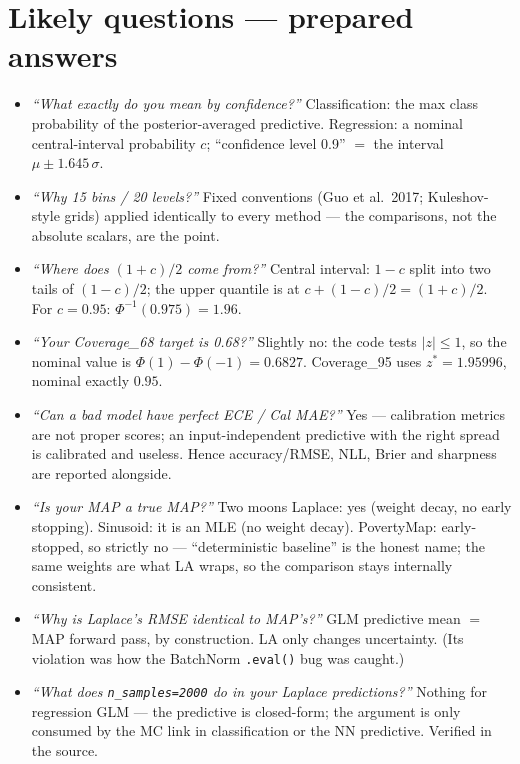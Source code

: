 \documentclass[10pt,a4paper]{article}
\newcommand{\code}[1]{\texttt{#1}}
\begin{document}
\section{Likely questions --- prepared answers}\label{sec:qa}
\begin{itemize}
\item \emph{``What exactly do you mean by confidence?''} Classification: the max class probability
  of the posterior-averaged predictive. Regression: a nominal central-interval probability $c$;
  ``confidence level 0.9'' $=$ the interval $\mu\pm1.645\,\sigma$.
\item \emph{``Why 15 bins / 20 levels?''} Fixed conventions (Guo et al.\ 2017; Kuleshov-style
  grids) applied identically to every method --- the comparisons, not the absolute scalars, are
  the point.
\item \emph{``Where does $(1+c)/2$ come from?''} Central interval: $1-c$ split into two tails of
  $(1-c)/2$; the upper quantile is at $c+(1-c)/2=(1+c)/2$. For $c{=}0.95$: $\Phi^{-1}(0.975)=1.96$.
\item \emph{``Your Coverage\_68 target is 0.68?''} Slightly no: the code tests $|z|\le1$, so the
  nominal value is $\Phi(1)-\Phi(-1)=0.6827$. Coverage\_95 uses $z^*{=}1.95996$, nominal exactly
  $0.95$.
\item \emph{``Can a bad model have perfect ECE / Cal MAE?''} Yes --- calibration metrics are not
  proper scores; an input-independent predictive with the right spread is calibrated and useless.
  Hence accuracy/RMSE, NLL, Brier and sharpness are reported alongside.
\item \emph{``Is your MAP a true MAP?''} Two moons Laplace: yes (weight decay, no early stopping).
  Sinusoid: it is an MLE (no weight decay). PovertyMap: early-stopped, so strictly no ---
  ``deterministic baseline'' is the honest name; the same weights are what LA wraps, so the
  comparison stays internally consistent.
\item \emph{``Why is Laplace's RMSE identical to MAP's?''} GLM predictive mean $=$ MAP forward
  pass, by construction. LA only changes uncertainty. (Its violation was how the BatchNorm
  \code{.eval()} bug was caught.)
\item \emph{``What does \code{n\_samples=2000} do in your Laplace predictions?''} Nothing for
  regression GLM --- the predictive is closed-form; the argument is only consumed by the MC link
  in classification or the NN predictive. Verified in the source.

\end{itemize}
\end{document}

